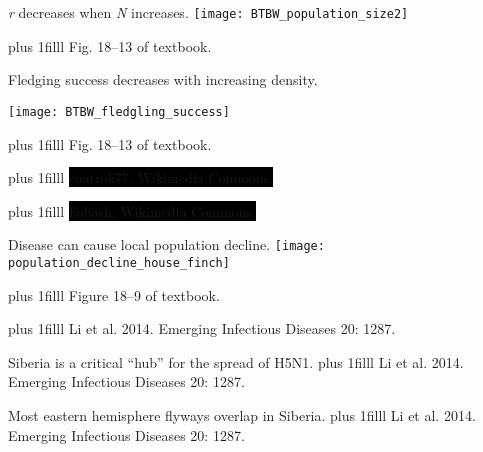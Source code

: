 \documentclass[t]{beamer}
\newcommand\imagecredit[1]{%
	\vskip0pt plus 1filll \tiny #1}%
\begin{document}
\begin{frame}[t,plain]{\emph{r} decreases when \emph{N} increases.}
	\centering
		\texttt{[image: BTBW\_population\_size2]}

	\imagecredit{\hfill Fig. 18--13 of textbook.}
\end{frame}

\begin{frame}[t,plain]{Fledging success decreases with increasing density.}
	\begin{center}
		\texttt{[image: BTBW\_fledgling\_success]}
	\end{center}	

	\imagecredit{\hfill Fig. 18--13 of textbook.}
\end{frame}

{
\begin{frame}[t,plain]{}
\imagecredit{\hfill\colorbox{black}{\color{white} cuatrok77, Wikimedia Commons.}}
\end{frame}
}


{
\begin{frame}[t,plain]{}
\imagecredit{\hfill\colorbox{black}{\color{white} Foliash, Wikimedia Commons.}}
\end{frame}
}

\begin{frame}[t,plain]{Disease can cause local population decline.}
	\centering
		\texttt{[image: population\_decline\_house\_finch]}

	\imagecredit{\hfill Figure 18--9 of textbook.}
\end{frame}

{
\begin{frame}[t,plain]{}
\imagecredit{\hfill Li et al. 2014. Emerging Infectious Diseases 20: 1287.}
\end{frame}
}

{
\begin{frame}[t,plain]{Siberia is a critical “hub” for the spread of H5N1.}
\imagecredit{\hfill Li et al. 2014. Emerging Infectious Diseases 20: 1287.}
\end{frame}
}

{
\begin{frame}[t,plain]{Most eastern hemisphere flyways overlap in Siberia.}
\imagecredit{Li et al. 2014. Emerging Infectious Diseases 20: 1287.}
\end{frame}
}
\end{document}

